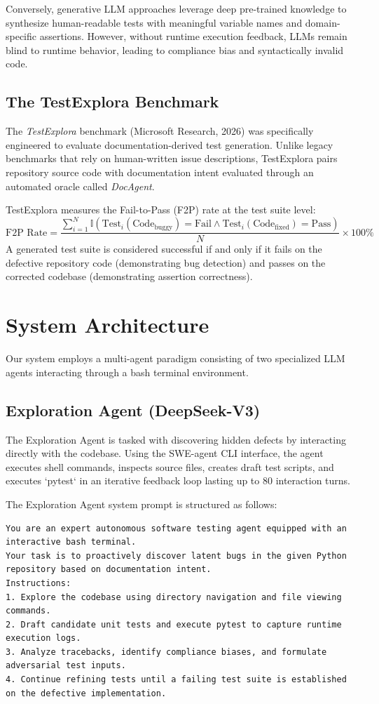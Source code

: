 \documentclass[conference]{IEEEtran}
\begin{document}
Conversely, generative LLM approaches leverage deep pre-trained knowledge to synthesize human-readable tests with meaningful variable names and domain-specific assertions. However, without runtime execution feedback, LLMs remain blind to runtime behavior, leading to compliance bias and syntactically invalid code.

\subsection{The TestExplora Benchmark}
The \textit{TestExplora} benchmark (Microsoft Research, 2026) was specifically engineered to evaluate documentation-derived test generation. Unlike legacy benchmarks that rely on human-written issue descriptions, TestExplora pairs repository source code with documentation intent evaluated through an automated oracle called \textit{DocAgent}.

TestExplora measures the Fail-to-Pass (F2P) rate at the test suite level:
\begin{equation}
\text{F2P Rate} = \frac{\sum_{i=1}^{N} \mathbb{I}(\text{Test}_i(\text{Code}_{\text{buggy}}) = \text{Fail} \land \text{Test}_i(\text{Code}_{\text{fixed}}) = \text{Pass})}{N} \times 100\%
\end{equation}
A generated test suite is considered successful if and only if it fails on the defective repository code (demonstrating bug detection) and passes on the corrected codebase (demonstrating assertion correctness).

\section{System Architecture}

Our system employs a multi-agent paradigm consisting of two specialized LLM agents interacting through a bash terminal environment.

\subsection{Exploration Agent (DeepSeek-V3)}
The Exploration Agent is tasked with discovering hidden defects by interacting directly with the codebase. Using the SWE-agent CLI interface, the agent executes shell commands, inspects source files, creates draft test scripts, and executes `pytest` in an iterative feedback loop lasting up to 80 interaction turns.

The Exploration Agent system prompt is structured as follows:
\begin{lstlisting}
You are an expert autonomous software testing agent equipped with an interactive bash terminal.
Your task is to proactively discover latent bugs in the given Python repository based on documentation intent.
Instructions:
1. Explore the codebase using directory navigation and file viewing commands.
2. Draft candidate unit tests and execute pytest to capture runtime execution logs.
3. Analyze tracebacks, identify compliance biases, and formulate adversarial test inputs.
4. Continue refining tests until a failing test suite is established on the defective implementation.
\end{lstlisting}
\end{document}

